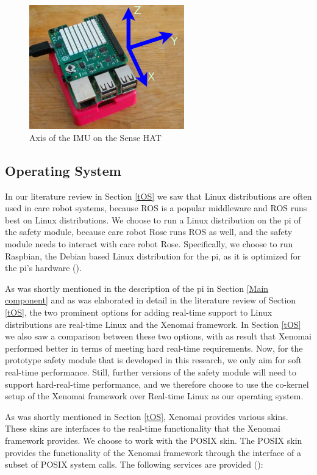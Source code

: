 \documentclass[12pt]{scrreprt}
\begin{document}
\begin{figure}[H]
    \centering
    \includegraphics[width=0.6\textwidth]{Figures/results/pi_not_above.png}
    \caption{Axis of the IMU on the Sense HAT}
    \label{fig:imu_orientation}
\end{figure}

\subsection{Operating System}
\label{Operating System}
In our literature review in Section \ref{tOS} we saw that Linux distributions are often used in care robot systems, because ROS is a popular middleware and ROS runs best on Linux distributions. We choose to run a Linux distribution on the \gls{pi} of the safety module, because care robot Rose runs ROS as well, and the safety module needs to interact with care robot Rose. Specifically, we choose to run Raspbian, the Debian based Linux distribution for the \gls{pi}, as it is optimized for the \gls{pi}'s hardware (\cite{raspbian}).
\par
As was shortly mentioned in the description of the \gls{pi} in Section \ref{Main component} and as was elaborated in detail in the literature review of Section \ref{tOS}, the two prominent options for adding real-time support to Linux distributions are real-time Linux and the Xenomai framework. In Section \ref{tOS} we also saw a comparison between these two options, with as result that Xenomai performed better in terms of meeting hard real-time requirements. Now, for the prototype safety module that is developed in this research, we only aim for soft real-time performance. Still, further versions of the safety module will need to support hard-real-time performance, and we therefore choose to use the co-kernel setup of the Xenomai framework over Real-time Linux as our operating system.
\par 
As was shortly mentioned in Section \ref{tOS}, Xenomai provides various skins. These skins are interfaces to the real-time functionality that the Xenomai framework provides. We choose to work with the POSIX skin. The POSIX skin provides the functionality of the Xenomai framework through the interface of a subset of POSIX system calls. The following services are provided (\cite{posix_xenomai}):
\end{document}
